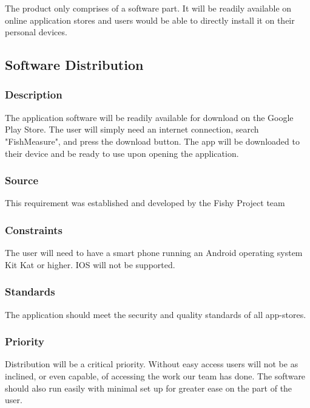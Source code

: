 The product only comprises of a software part. It will be readily available on online application stores and users would be able to directly install it on their personal devices.

\subsection{ Software Distribution}
\subsubsection{Description}
The application software will be readily available for download on the Google Play Store. The user will simply need an internet connection, search "FishMeasure", and press the download button. The app will be downloaded to their device and be ready to use upon opening the application.
\subsubsection{Source}
 This requirement was established and developed by the Fishy Project team
\subsubsection{Constraints}
The user will need to have a smart phone running an Android operating system Kit Kat or higher. IOS will not be supported.
\subsubsection{Standards}
The application should meet the security and quality standards of all app-stores.
\subsubsection{Priority}
 Distribution will be a critical priority. Without easy access users will not be as inclined, or even capable, of accessing the work our team has done. The software should also run easily with minimal set up for greater ease on the part of the user.